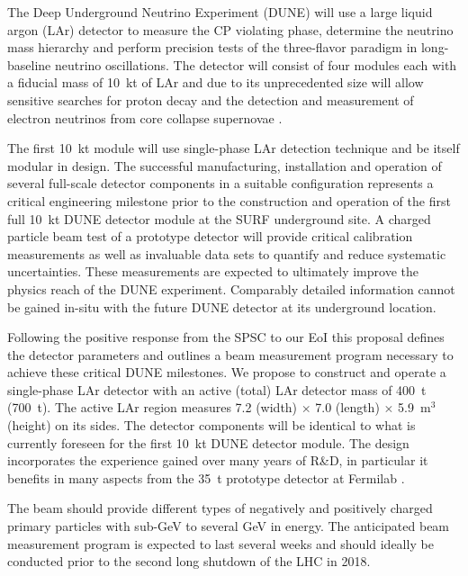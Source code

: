 \vspace{0.5cm}
The Deep Underground Neutrino Experiment (DUNE) will use a large liquid argon (LAr) detector to measure the CP violating phase, determine the neutrino mass hierarchy and perform precision tests of the three-flavor paradigm in long-baseline neutrino oscillations. The detector will consist of four modules 
each with a fiducial mass of 10~kt of LAr and due to its unprecedented size will allow sensitive searches for proton decay and the detection and measurement of electron neutrinos from core collapse supernovae \cite{dunecdr}.

The first 10~kt module will use single-phase LAr detection technique and be itself modular in design. The successful manufacturing, installation and operation of several full-scale detector components in a suitable configuration represents a critical engineering milestone prior to the construction and operation of the first full 10~kt DUNE detector module at the SURF underground site. 
A charged particle beam test of a prototype detector will provide critical
calibration measurements as well as invaluable data sets to quantify and
reduce systematic uncertainties.
These measurements are expected to ultimately improve the physics reach of the DUNE experiment. Comparably detailed information cannot be gained in-situ with the future DUNE detector at its underground location.

Following the positive response from the SPSC to our EoI \cite{eoi} 
this proposal defines the detector parameters and outlines a beam measurement program
necessary to achieve these critical DUNE milestones.
%
We propose to construct and operate a single-phase LAr detector with an active (total) LAr detector mass of 400~t (700~t). 
The active LAr region measures 7.2 (width) $\times$ 7.0 (length) $\times$ 5.9~m$^3$ (height) on its sides.
The detector components will be identical to what is currently foreseen for the first 10~kt DUNE detector module. The design incorporates the
experience gained over many years of R\&D, in particular it benefits in many aspects from the 35~t prototype detector at Fermilab \cite{montanari_35ton,montanari_35ton_perf}.

The beam should provide different types of negatively and positively charged primary particles with 
sub-GeV to several GeV in energy.
The anticipated beam measurement program
is expected to last several weeks and should ideally be conducted prior to the second 
long shutdown of the LHC in 2018. 

